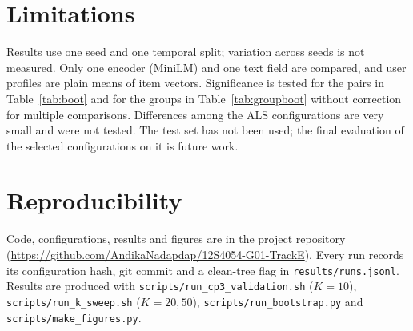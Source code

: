 \section{Limitations}
\label{sec:limitations}
Results use one seed and one temporal split; variation across seeds is not measured. Only one encoder
(MiniLM) and one text field are compared, and user profiles are plain means of item vectors.
Significance is tested for the pairs in Table~\ref{tab:boot} and for the groups in
Table~\ref{tab:groupboot} without correction for multiple comparisons. Differences among the ALS
configurations are very small and were not tested. The test set has not been used; the final evaluation
of the selected configurations on it is future work.

\section{Reproducibility}
Code, configurations, results and figures are in the project repository
(\url{https://github.com/AndikaNadapdap/12S4054-G01-TrackE}). Every run records its configuration hash,
git commit and a clean-tree flag in \texttt{results/runs.jsonl}. Results are produced with
\texttt{scripts/run\_cp3\_validation.sh} ($K=10$), \texttt{scripts/run\_k\_sweep.sh} ($K=20,50$),
\texttt{scripts/run\_bootstrap.py} and \texttt{scripts/make\_figures.py}.

